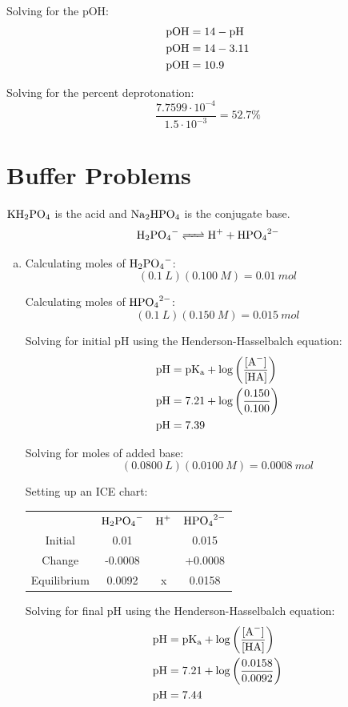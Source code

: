 \documentclass{article}
\begin{document}
Solving for the pOH:
\begin{align*}
    \rm{pOH} &= 14 - \rm{pH} \\
    \rm{pOH} &= 14 - 3.11 \\
    \rm{pOH} &= 10.9
\end{align*}

Solving for the percent deprotonation:
$$\frac{7.7599 \cdot 10^{-4}}{1.5 \cdot 10^{-3}} = 52.7 \%$$

\section{Buffer Problems}

$\ce{KH_2PO_4}$ is the acid and $\ce{Na_2HPO_4}$ is the conjugate base.
$$\ce{H_2PO_4- <=> H+ + HPO_4^{2-} }$$

\begin{enumerate}[(a)]
    \item Calculating moles of $\ce{H_2PO_4-}$:
        $$(0.1\ \si{L})(0.100\ \si{M}) = 0.01\ \si{mol}$$

        Calculating moles of $\ce{HPO_4^{2-}}$:
        $$(0.1\ \si{L})(0.150\ \si{M}) = 0.015\ \si{mol}$$

        Solving for initial pH using the Henderson-Hasselbalch equation:
        \begin{align*}
            \rm{pH} &= \rm{pK_a} + \log \left( \frac{[\ce{A-}]}{[\ce{HA}]}
            \right) \\
            \rm{pH} &= 7.21 + \log \left( \frac{0.150}{0.100} \right) \\
            \rm{pH} &= 7.39
        \end{align*}

        Solving for moles of added base:
        $$(0.0800\ \si{L})(0.0100\ \si{M}) = 0.0008\ \si{mol}$$
        
        Setting up an ICE chart:
        \begin{center}
            \begin{tabular}{c c c c}
                & $\ce{H_2PO_4-}$ & $\ce{H+}$ & $\ce{HPO_4^{2-}}$ \\
                Initial & 0.01 &  & 0.015 \\
                Change & -0.0008 &  & +0.0008 \\
                Equilibrium & 0.0092 & x & 0.0158
            \end{tabular}
        \end{center}

        Solving for final pH using the Henderson-Hasselbalch equation:
        \begin{align*}
            \rm{pH} &= \rm{pK_a} + \log \left( \frac{[\ce{A-}]}{[\ce{HA}]}
            \right) \\
            \rm{pH} &= 7.21 + \log \left( \frac{0.0158}{0.0092} \right) \\
            \rm{pH} &= 7.44
        \end{align*}


\end{enumerate}
\end{document}
